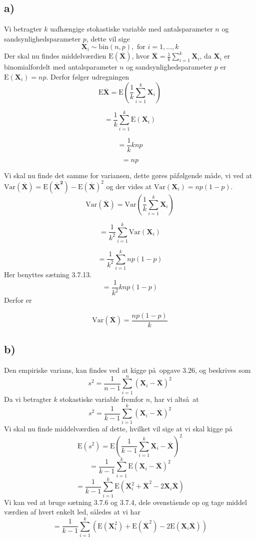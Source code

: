 {
\newcommand{\ud}{\, \mathrm{d}}
\newcommand{\mb}[1]{\mathbf{#1}}
\newcommand{\tr}[1]{\textrm{#1}}
\newcommand{\indep}{{\;\bot\!\!\!\!\!\!\bot\;}}

\newenvironment{nospace}%
{\noindent\ignorespaces}%
{\par\noindent%
  \ignorespacesafterend}
\subsection*{a)}
Vi betragter $k$ uafh\ae ngige stokastiske variable med antalsparameter $n$ og sandsynlighedsparameter $p$, dette vil sige
\[
\mb{X}_i \sim{ \tr{bin} \left( n,p \right) } , \tr{ for } i = 1,\dots,k
\]
Der skal nu findes middelv\ae rdien $\tr{E}(\overline{\mb{X}})$, hvor $\overline{\mb{X}} = \frac{1}{k} \sum_{i = 1}^k \mb{X}_i$, da $\mb{X}_i$ er binomialfordelt med antalsparameter $n$ og sandsynlighedsparameter $p$ er $\tr{E}(\mb{X}_i) = np$. Derfor f\o lger udregningen
\[
\tr{E}\mb{\overline{X}} = \tr{E} \left(\frac{1}{k}\sum_{i = 1}^k \mb{X}_i \right)
\]

\[
= \frac{1}{k}\sum_{i = 1}^k \tr{E}(\mb{X}_i)
\]

\[
= \frac{1}{k}k np
\]

\[
= np
\]

Vi skal nu finde det samme for variansen, dette g\o res p\aa f\o lgende m\aa de, vi ved at $\tr{Var}(\mb{\overline{X}}) = \tr{E}(\mb{\overline{X}^2}) - \tr{E}(\mb{\overline{X}})^2$ og der vides at $\tr{Var}(\mb{X}_i) = np(1-p)$.
\[
\tr{Var}(\mb{\overline{X}}) = \tr{Var}(\frac{1}{k} \sum_{i = 1}^k \mb{X}_i)
\]

\[
= \frac{1}{k^2} \sum_{i = 1}^k \tr{Var}(\mb{X}_i)
\]

\[
=\frac{1}{k^2} \sum_{i = 1}^k np(1-p)
\]
Her benyttes s\ae tning 3.7.13.
\[
= \frac{1}{k^2} k np(1-p)
\]
Derfor er

\[
\tr{Var}(\mb{\overline{X}}) = \frac{np(1-p)}{k}
\]

\subsection*{b)}
Den empiriske varians, kan findes ved at kigge p\aa\ opgave 3.26, og beskrives som
\[
s^2 = \frac{1}{n-1}\sum_{i = 1}^{n}\left(\mb{X}_i - \mb{\overline{X}}\right)^2
\]
Da vi betragter $k$ stokastiske variable fremfor $n$, har vi alts\aa\ at
\[
s^2 = \frac{1}{k-1}\sum_{i = 1}^{k}\left(\mb{X}_i - \mb{\overline{X}}\right)^2
\]
Vi skal nu finde middelv\ae rdien af dette, hvilket vil sige at vi skal kigge p\aa
\[
\tr{E}(s^2) = \tr{E}\left( \frac{1}{k-1}\sum_{i = 1}^{k}\mb{X}_i - \mb{\overline{X}}\right)^2
\]
\[
= \frac{1}{k-1}\sum_{i = 1}^{k} \tr{E}\left(\mb{X}_i - \mb{\overline{X}} \right)^{2}
\]
\[
= \frac{1}{k-1}\sum_{i = 1}^{k} \tr{E}\left(\mb{X}_{i}^{2} + \mb{\overline{X}}^{2} - 2\mb{X}_i\mb{\overline{X}} \right)
\]
Vi kan ved at bruge s\ae tning 3.7.6 og 3.7.4, dele ovenst\aa ende op og tage middel v\ae rdien af hvert enkelt led, s\aa ledes at vi har
\[
= \frac{1}{k-1} \sum_{i = 1}^{k} \left( \tr{E} \left( \mb{X}_{i}^{2} \right) + \tr{E} \left( \mb{\overline{X}}^{2} \right) - 2 \tr{E} \left( \mb{X}_i \mb{\overline{X}} \right) \right)
\]

}
